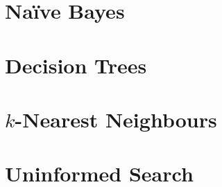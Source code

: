 \documentclass[
  11pt,
  a4paper,
]{article}
\begin{document}
\section{Na\"{i}ve Bayes}


\section{Decision Trees}


\section{\texorpdfstring{\( k \)}{k}-Nearest Neighbours}


\section{Uninformed Search}

\end{document}
